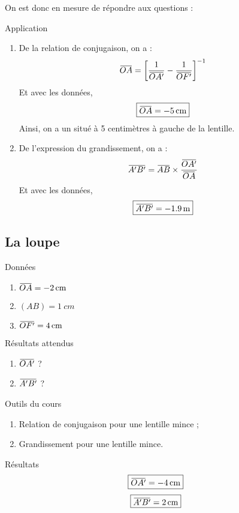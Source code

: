 \documentclass[10pt,a5paper,notitlepage]{book}
\begin{document}
On est donc en mesure de répondre aux questions :

\begin{lgtcb}{Application}
    \begin{enumerate}
        \item De la relation de conjugaison, on a :
            \[\OA = \left[ \frac{1}{\OAp} - \frac{1}{\OF} \right]^{-1}\]
            Et avec les données,
            \[ \boxed{\OA = \SI{- 5}{cm}}\]
            Ainsi, on a un  situé à 5 centimètres à gauche de
            la lentille.

        \item De l'expression du grandissement, on a :
            \[\ABp = \ABb\times\frac{\OAp}{\OA}\]
            Et avec les données,
            \[ \boxed{\ABp = \SI{- 1.9}{m}} \]
    \end{enumerate}
\end{lgtcb}

\subsection{La loupe}
\begin{vtcb}{Données}
    \begin{enumerate}
        \item $\OA = \SI{-2}{cm}$
        \item $(AB) = \SI{1}{cm}$
        \item $\OF = \SI{4}{cm}$
    \end{enumerate}
\end{vtcb}

\begin{rtcb}{Résultats attendus}
    \begin{enumerate}
        \item $\OAp$ ?
        \item $\ABp$ ?
    \end{enumerate}
\end{rtcb}

\begin{btcb}{Outils du cours}
   \begin{enumerate}
       \item Relation de conjugaison pour une lentille mince ;
       \item Grandissement pour une lentille mince.
   \end{enumerate} 
\end{btcb}

\begin{lgtcb}{Résultats}
    \[ \boxed{\OAp = \SI{-4}{cm}} \]
    \[ \boxed{\ABp = \SI{2}{cm}} \]
\end{lgtcb}
\end{document}
